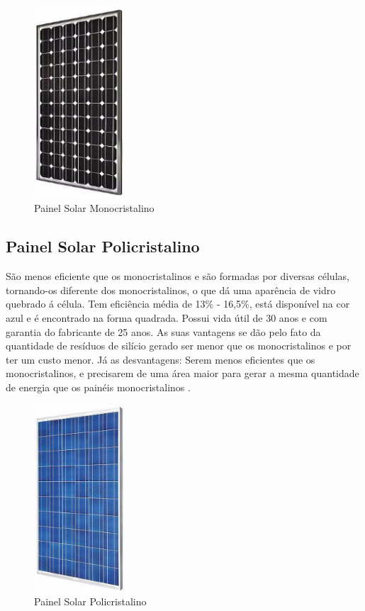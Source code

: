 \begin{figure}[!h]
\centering
\includegraphics[width=0.3\textwidth]{figuras/placa.png}
\caption{Painel Solar Monocristalino}
\label{fig:placa}
\end{figure}

\subsection{Painel Solar Policristalino}

São menos eficiente que os monocristalinos e são formadas por diversas células, tornando-os diferente dos monocristalinos, o que dá uma aparência de vidro quebrado á célula. Tem eficiência média de 13\% - 16,5\%, está disponível na cor azul e é encontrado na forma quadrada. Possui vida útil de 30 anos e com garantia do fabricante de 25 anos. As suas vantagens se dão pelo fato da quantidade de resíduos de silício gerado ser menor que os monocristalinos e por ter um custo menor. Já as desvantagens: Serem menos eficientes que os monocristalinos, e precisarem de uma área maior para gerar a mesma quantidade de energia que os painéis monocristalinos \cite{neosolar}.

\begin{figure}[!h]
\centering
\includegraphics[width=0.3\textwidth]{figuras/painel.png}
\caption{Painel Solar Policristalino}
\label{fig:painel}
\end{figure}


